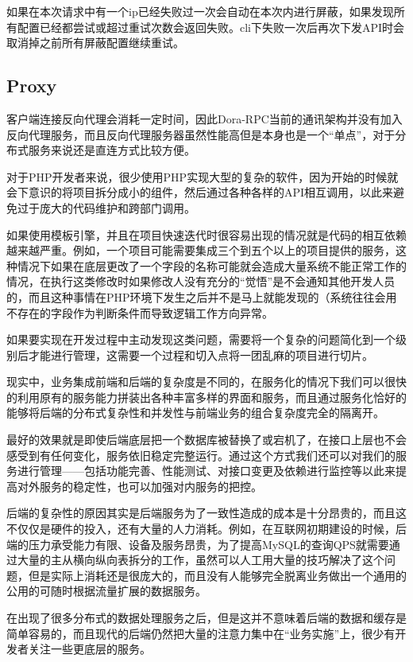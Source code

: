 如果在本次请求中有一个ip已经失败过一次会自动在本次内进行屏蔽，如果发现所有配置已经都尝试或超过重试次数会返回失败。cli下失败一次后再次下发API时会取消掉之前所有屏蔽配置继续重试。

\subsection{Proxy}

客户端连接反向代理会消耗一定时间，因此Dora-RPC当前的通讯架构并没有加入反向代理服务，而且反向代理服务器虽然性能高但是本身也是一个“单点”，对于分布式服务来说还是直连方式比较方便。





对于PHP开发者来说，很少使用PHP实现大型的复杂的软件，因为开始的时候就会下意识的将项目拆分成小的组件，然后通过各种各样的API相互调用，以此来避免过于庞大的代码维护和跨部门调用。


如果使用模板引擎，并且在项目快速迭代时很容易出现的情况就是代码的相互依赖越来越严重。例如，一个项目可能需要集成三个到五个以上的项目提供的服务，这种情况下如果在底层更改了一个字段的名称可能就会造成大量系统不能正常工作的情况，在执行这类修改时如果修改人没有充分的“觉悟”是不会通知其他开发人员的，而且这种事情在PHP环境下发生之后并不是马上就能发现的（系统往往会用不存在的字段作为判断条件而导致逻辑工作方向异常。

如果要实现在开发过程中主动发现这类问题，需要将一个复杂的问题简化到一个级别后才能进行管理，这需要一个过程和切入点将一团乱麻的项目进行切片。

现实中，业务集成前端和后端的复杂度是不同的，在服务化的情况下我们可以很快的利用原有的服务能力拼装出各种丰富多样的界面和服务，而且通过服务化恰好的能够将后端的分布式复杂性和并发性与前端业务的组合复杂度完全的隔离开。

最好的效果就是即使后端底层把一个数据库被替换了或宕机了，在接口上层也不会感受到有任何变化，服务依旧稳定完整运行。通过这个方式我们还可以对我们的服务进行管理——包括功能完善、性能测试、对接口变更及依赖进行监控等以此来提高对外服务的稳定性，也可以加强对内服务的把控。

后端的复杂性的原因其实是后端服务为了一致性造成的成本是十分昂贵的，而且这不仅仅是硬件的投入，还有大量的人力消耗。例如，在互联网初期建设的时候，后端的压力承受能力有限、设备及服务昂贵，为了提高MySQL的查询QPS就需要通过大量的主从横向纵向表拆分的工作，虽然可以人工用大量的技巧解决了这个问题，但是实际上消耗还是很庞大的，而且没有人能够完全脱离业务做出一个通用的公用的可随时根据流量扩展的数据服务。

在出现了很多分布式的数据处理服务之后，但是这并不意味着后端的数据和缓存是简单容易的，而且现代的后端仍然把大量的注意力集中在“业务实施”上，很少有开发者关注一些更底层的服务。


